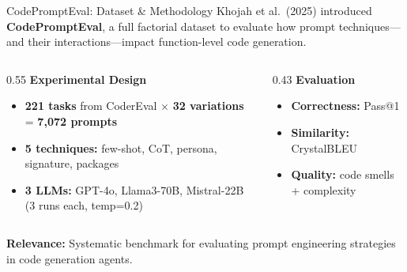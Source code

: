 \documentclass[
11pt,notheorems,hyperref={pdfauthor=whatever}
]{beamer}
\begin{document}
\begin{frame}{CodePromptEval: Dataset \& Methodology}
	Khojah et al.\ (2025) introduced \textbf{CodePromptEval}, a full factorial dataset to evaluate how prompt techniques---and their interactions---impact function-level code generation.

	\vspace{0.25cm}

	\begin{columns}[T]
		\begin{column}{0.55\textwidth}
			\textbf{Experimental Design}
			\begin{itemize}
				\item \textbf{221 tasks} from CoderEval $\times$ \textbf{32 variations} = \textbf{7,072 prompts}
				\item \textbf{5 techniques:} few-shot, CoT, persona, signature, packages
				\item \textbf{3 LLMs:} GPT-4o, Llama3-70B, Mistral-22B (3 runs each, temp=0.2)
			\end{itemize}
		\end{column}
		\hfill
		\begin{column}{0.43\textwidth}
			\textbf{Evaluation}
			\begin{itemize}
				\item \textbf{Correctness:} Pass@1
				\item \textbf{Similarity:} CrystalBLEU
				\item \textbf{Quality:} code smells + complexity
			\end{itemize}
		\end{column}
	\end{columns}

	\vspace{0.25cm}

	\textbf{Relevance:} Systematic benchmark for evaluating prompt engineering strategies in code generation agents.
\end{frame}
\end{document}
